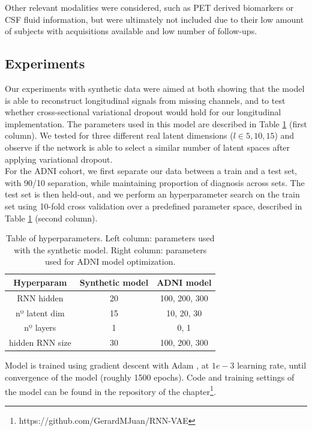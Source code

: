 Other relevant modalities were considered, such as PET derived biomarkers or CSF fluid information, but were ultimately not included due to their low amount of subjects with acquisitions available and low number of follow-ups. \\ 

\subsection{Experiments}

Our experiments with synthetic data were aimed at both showing that the model is able to reconstruct longitudinal signals from missing channels, and to test whether cross-sectional variational dropout would hold for our longitudinal implementation. The parameters used in this model are described in Table \ref{rnn:tablehyper} (first column). We tested for three different real latent dimensions ($l \in {5,10,15}$) and observe if the network is able to select a similar number of latent spaces after applying variational dropout. \\

For the ADNI cohort, we first separate our data between a train and a test set, with 90/10 separation, while maintaining proportion of diagnosis across sets. The test set is then held-out, and we perform an hyperparameter search on the train set using 10-fold cross validation over a predefined parameter space, described in Table \ref{rnn:tablehyper} (second column). \\

\begin{table}[!htbp]
\centering
\begin{tabular}{@{}ccc@{}}
\toprule
Hyperparam & Synthetic model & ADNI model \\ \midrule
RNN hidden    &   20    & 100, 200, 300  \\
nº latent dim    &  15   & 10, 20, 30 \\
nº layers    &  1   & 0, 1  \\
hidden RNN size  &  30   & 100, 200, 300  \\ \bottomrule
\end{tabular}
\caption[Hyperparameter table.]{Table of hyperparameters. Left column: parameters used with the synthetic model. Right column: parameters used for ADNI model optimization.}\label{rnn:tablehyper}
\end{table}

Model is trained using gradient descent with Adam \cite{Kingma2015a}, at $1e-3$ learning rate, until convergence of the model (roughly 1500 epochs). Code and training settings of the model can be found in the repository of the chapter\footnote{https://github.com/GerardMJuan/RNN-VAE}. \\

